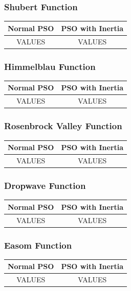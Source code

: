 \subsubsection{Shubert Function}
\begin{center}
	\begin{tabular}{| c | c |}
	\hline
	Normal PSO & PSO with Inertia \\  \hline
	VALUES & VALUES \\ \hline
	\end{tabular}
\end{center}
\subsubsection{Himmelblau Function}
\begin{center}
	\begin{tabular}{| c | c |}
	\hline
	Normal PSO & PSO with Inertia \\  \hline
	VALUES & VALUES \\ \hline
	\end{tabular}
\end{center}
\subsubsection{Rosenbrock Valley Function}
\begin{center}
	\begin{tabular}{| c | c |}
	\hline
	Normal PSO & PSO with Inertia \\  \hline
	VALUES & VALUES \\ \hline
	\end{tabular}
\end{center}
\subsubsection{Dropwave Function}
\begin{center}
	\begin{tabular}{| c | c |}
	\hline
	Normal PSO & PSO with Inertia \\  \hline
	VALUES & VALUES \\ \hline
	\end{tabular}
\end{center}
\subsubsection{Easom Function}
\begin{center}
	\begin{tabular}{| c | c |}
	\hline
	Normal PSO & PSO with Inertia \\  \hline
	VALUES & VALUES \\ \hline
	\end{tabular}
\end{center}
